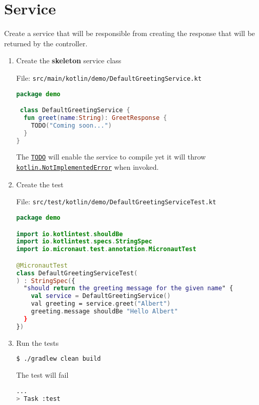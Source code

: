 \section{Service}\label{sec:service}

Create a service that will be responsible from creating the response that will be returned by the controller.

\begin{enumerate}

\item Create the \textbf{skeleton} service class

File: \texttt{src/main/kotlin/demo/DefaultGreetingService.kt}
\begin{lstlisting}[language=Kotlin]
package demo

 class DefaultGreetingService {
  fun greet(name:String): GreetResponse {
    TODO("Coming soon...")
  }
}
\end{lstlisting}

The \href{https://kotlinlang.org/api/latest/jvm/stdlib/kotlin/-t-o-d-o.html}{\texttt{TODO}} will enable the service to compile yet it will throw \href{https://kotlinlang.org/api/latest/jvm/stdlib/kotlin/-not-implemented-error/}{\texttt{kotlin.NotImplementedError}} when invoked.

\item Create the test

File: \texttt{src/test/kotlin/demo/DefaultGreetingServiceTest.kt}
\begin{lstlisting}[language=Kotlin]
package demo

import io.kotlintest.shouldBe
import io.kotlintest.specs.StringSpec
import io.micronaut.test.annotation.MicronautTest

@MicronautTest
class DefaultGreetingServiceTest(
) : StringSpec({
  "should return the greeting message for the given name" {
    val service = DefaultGreetingService()
    val greeting = service.greet("Albert")
    greeting.message shouldBe "Hello Albert"
  }
})
\end{lstlisting}

\item Run the tests

\begin{lstlisting}[language=bash]
$ ./gradlew clean build
\end{lstlisting}

The test will fail

\begin{lstlisting}[language=bash]
...
> Task :test


\end{lstlisting}
\end{enumerate}

